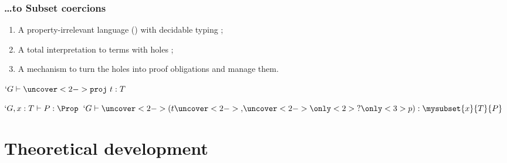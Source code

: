 \begin{frame}[t]
  \frametitle{\ldots to Subset coercions}
  
  \begin{enumerate}
  \item<1-> A property-irrelevant language (\Russell{}) with \alert{decidable} typing ;
  \item<2-> A total interpretation to \Coq{} terms with holes ;
  \item<3-> A mechanism to turn the holes into proof obligations and
    manage them.
  \end{enumerate}
  
  \begin{center}
    {$`G \typea \uncover<2->{\texttt{proj}~}t : T$}
    {}\DP

    \vspace{0.5cm}
    {$`G, x : T \type P : \Prop$}
    {}
    {$`G \type \uncover<2->{(}t\uncover<2->{, }\uncover<2->{{\only<2>{?}\only<3>{p}})} : \mysubset{x}{T}{P}$}
    {}\DP
  \end{center}
  

\end{frame}

\section{Theoretical development}

\subsection{\Russell{}}

